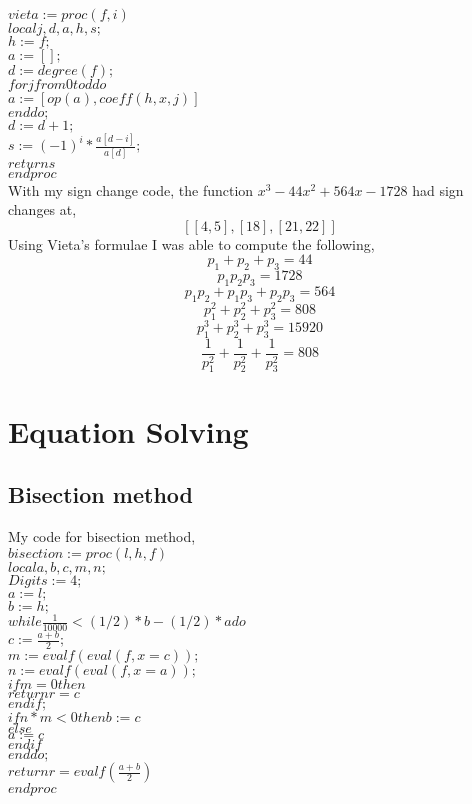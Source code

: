 \documentclass[12pt]{article}
\begin{document}
$vieta := proc (f, i)$\\
$local j, d, a, h, s;$\\
$h := f;$\\
$a := [];$\\
$d := degree(f);$\\
$for j from 0 to d do$\\
$a := [op(a), coeff(h, x, j)]$\\
$end do;$\\
$d := d+1;$\\
$s := (-1)^i*\frac{a[d-i]}{a[d]};$\\
$return s$\\
$end proc$\\

With my sign change code, the function $x^3-44x^2+564x-1728$ had sign changes at,
$$[[4, 5], [18], [21, 22]]$$
Using Vieta's formulae I was able to compute the following,
$$p_1+p_2+p_3 = 44$$
$$p_1p_2p_3 = 1728$$
$$p_1p_2+p_1p_3 +p_2p_3 = 564$$
$$p_1^2+p_2^2+p_3^2 = 808$$
$$p_1^3+p_2^3+p_3^3 = 15920$$
$$\frac{1}{p_1^2}+\frac{1}{p_2^2}+\frac{1}{p_3^2} = 808$$
\clearpage
\section{Equation Solving}
\subsection{Bisection method}
My code for bisection method,\\

$bisection := proc (l, h, f)$\\
$local a, b, c, m, n;$\\
$Digits := 4;$\\
$a := l;$\\
$b := h;$\\
$while \frac{1}{10000} < (1/2)*b-(1/2)*a do$\\
$c := \frac{a+b}{2};$\\
$m := evalf(eval(f, x = c));$\\
$n := evalf(eval(f, x = a));$\\
$if m = 0 then$\\
$return r = c$\\
$end if;$\\
$if n*m < 0 then b := c$\\
$else$\\
$a := c$\\
$end if$\\
$end do;$\\
$return r = evalf(\frac{a+b}{2})$\\
$end proc$\\
\end{document}
